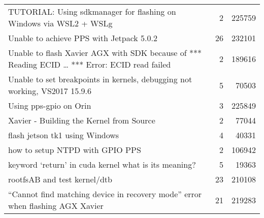 \begin{longtable}{p{}rr}
    TUTORIAL: Using sdkmanager for flashing on Windows via WSL2 + WSLg                                  & 2       & 225759 \\
    Unable to achieve PPS with Jetpack 5.0.2                                                            & 26      & 232101 \\
    Unable to flash Xavier AGX with SDK because of *** Reading ECID … *** Error: ECID read failed       & 2       & 189616 \\
    Unable to set breakpoints in kernels, debugging not working, VS2017 15.9.6                          & 5       & 70503  \\
    Using pps-gpio on Orin                                                                              & 3       & 225849 \\
    Xavier - Building the Kernel from Source                                                            & 2       & 77044  \\
    flash jetson tk1 using Windows                                                                      & 4       & 40331  \\
    how to setup NTPD with GPIO PPS                                                                     & 2       & 106942 \\
    keyword ‘return’ in cuda kernel what is its meaning?                                                & 5       & 19363  \\
    rootfsAB and test kernel/dtb                                                                        & 23      & 210108 \\
    “Cannot find matching device in recovery mode” error when flashing AGX Xavier                       & 21      & 219283
\end{longtable}


